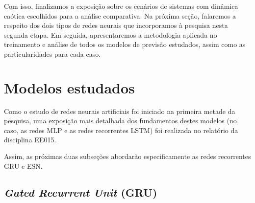 \documentclass[a4paper, 12pt]{article}
\begin{document}
Com isso, finalizamos a exposição sobre os cenários de sistemas com dinâmica caótica escolhidos para a análise comparativa. Na próxima seção, falaremos a respeito dos dois tipos de redes neurais que incorporamos à pesquisa nesta segunda etapa. Em seguida, apresentaremos a metodologia aplicada no treinamento e análise de todos os modelos de previsão estudados, assim como as particularidades para cada caso.

\section{Modelos estudados}

Como o estudo de redes neurais artificiais foi iniciado na primeira metade da pesquisa, uma exposição mais detalhada dos fundamentos destes modelos (no caso, as redes MLP e as redes recorrentes LSTM) foi realizada no relatório da disciplina EE015.

Assim, as próximas duas subseções abordarão especificamente as redes recorrentes GRU e ESN.

\subsection{\textit{Gated Recurrent Unit} (GRU)}
\end{document}
